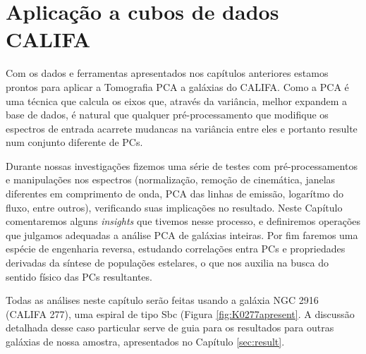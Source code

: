 



\chapter{Aplicação a cubos de dados CALIFA}
\label{sec:PCAaplic}

Com os dados e ferramentas apresentados nos capítulos anteriores estamos prontos para aplicar a Tomografia PCA a
galáxias do CALIFA. Como a PCA é uma técnica que calcula os eixos que, através da variância, melhor expandem a base de
dados, é natural que qualquer pré-processamento que modifique os espectros de entrada acarrete mudancas na variância
entre eles e portanto resulte num conjunto diferente de PCs. 

Durante nossas investigações fizemos uma série de testes com pré-processamentos e manipulações nos espectros
(normalização, remoção de cinemática, janelas diferentes em comprimento de onda, PCA das linhas de emissão, logarítmo do
fluxo, entre outros), verificando suas implicações no resultado. Neste Capítulo comentaremos alguns {\em insights} que
tivemos nesse processo, e definiremos operações que julgamos adequadas a análise PCA de galáxias inteiras. Por fim
faremos uma espécie de engenharia reversa, estudando correlações entra PCs e propriedades derivadas da síntese de
populações estelares, o que nos auxilia na busca do sentido físico das PCs resultantes.

Todas as análises neste capítulo serão feitas usando a galáxia NGC 2916 (CALIFA 277), uma espiral de tipo Sbc (Figura
\ref{fig:K0277apresent}. A discussão detalhada desse caso particular serve de guia para os resultados para outras
galáxias de nossa amostra, apresentados no Capítulo \ref{sec:result}.

